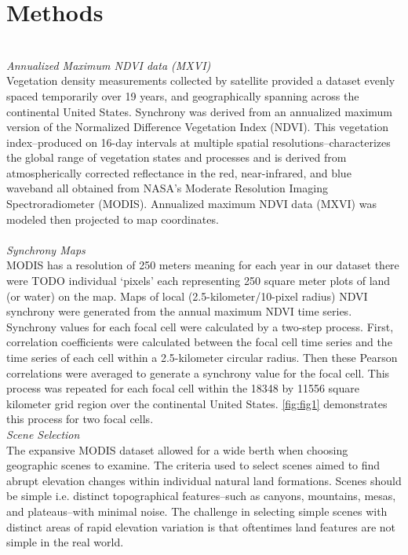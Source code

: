 \documentclass[letterpaper,11pt]{article}
\begin{document}
\section{Methods}\label{section:methods}
\\
\textit{Annualized Maximum NDVI data (MXVI)} \\
Vegetation density measurements collected by satellite provided a dataset evenly spaced temporarily over 19 years, and geographically spanning across the continental United States. Synchrony was derived from an annualized maximum version of the Normalized Difference Vegetation Index (NDVI). This vegetation index--produced on 16-day intervals at multiple spatial resolutions--characterizes the global range of vegetation states and processes and is derived from atmospherically corrected reflectance in the red, near-infrared, and blue waveband all obtained from NASA’s Moderate Resolution Imaging Spectroradiometer (MODIS). Annualized maximum NDVI data (MXVI) was modeled then projected to map coordinates. \\ \\
\textit{Synchrony Maps} \\
MODIS has a resolution of 250 meters meaning for each year in our dataset there were TODO individual ‘pixels’ each representing 250 square meter plots of land (or water) on the map. Maps of local (2.5-kilometer/10-pixel radius) NDVI synchrony were generated from the annual maximum NDVI time series. Synchrony values for each focal cell were calculated by a two-step process. First, correlation coefficients were calculated between the focal cell time series and the time series of each cell within a 2.5-kilometer circular radius. Then these Pearson correlations were averaged to generate a synchrony value for the focal cell. This process was repeated for each focal cell within the 18348 by 11556 square kilometer grid region over the continental United States. \ref{fig:fig1} demonstrates this process for two focal cells. \\
\textit{Scene Selection} \\
The expansive MODIS dataset allowed for a wide berth when choosing geographic scenes to examine. The criteria used to select scenes aimed to find abrupt elevation changes within individual natural land formations. Scenes should be simple i.e. distinct topographical features--such as canyons, mountains, mesas, and plateaus--with minimal noise. The challenge in selecting simple scenes with distinct areas of rapid elevation variation is that oftentimes land features are not simple in the real world.
\end{document}
